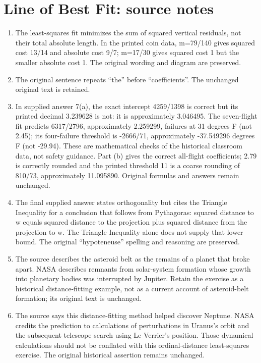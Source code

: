\section*{Line of Best Fit: source notes}
\begin{enumerate}
\item The least-squares fit minimizes the sum of squared vertical residuals, not their total absolute length. In the printed coin data, m=79/140 gives squared cost 13/14 and absolute cost 9/7; m=17/30 gives squared cost 1 but the smaller absolute cost 1. The original wording and diagram are preserved.
\item The original sentence repeats “the” before “coefficients”. The unchanged original text is retained.
\item In supplied answer 7(a), the exact intercept 4259/1398 is correct but its printed decimal 3.239628 is not: it is approximately 3.046495. The seven-flight fit predicts 6317/2796, approximately 2.259299, failures at 31 degrees F (not 2.45); its four-failure threshold is -2666/71, approximately -37.549296 degrees F (not -29.94). These are mathematical checks of the historical classroom data, not safety guidance. Part (b) gives the correct all-flight coefficients; 2.79 is correctly rounded and the printed threshold 11 is a coarse rounding of 810/73, approximately 11.095890. Original formulas and answers remain unchanged.
\item The final supplied answer states orthogonality but cites the Triangle Inequality for a conclusion that follows from Pythagoras: squared distance to w equals squared distance to the projection plus squared distance from the projection to w. The Triangle Inequality alone does not supply that lower bound. The original “hypoteneuse” spelling and reasoning are preserved.
\item The source describes the asteroid belt as the remains of a planet that broke apart. NASA describes remnants from solar-system formation whose growth into planetary bodies was interrupted by Jupiter. Retain the exercise as a historical distance-fitting example, not as a current account of asteroid-belt formation; its original text is unchanged.
\item The source says this distance-fitting method helped discover Neptune. NASA credits the prediction to calculations of perturbations in Uranus’s orbit and the subsequent telescope search using Le Verrier’s position. Those dynamical calculations should not be conflated with this ordinal-distance least-squares exercise. The original historical assertion remains unchanged.

\end{enumerate}
